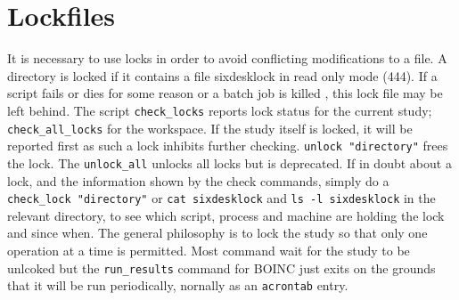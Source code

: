 \documentclass{cernatsnote}    %
\begin{document}
\section{Lockfiles}
It is necessary to use locks in order to
avoid conflicting modifications to a file. A directory is locked if
it contains a file sixdesklock in read only mode (444).
If a script fails or dies for some reason or a batch job
is killed , this lock file may be left behind. The script
{\tt check\_locks} reports lock status for the current study;
{\tt check\_all\_locks} for the workspace. If the study itself is
locked, it will be reported first as such a lock inhibits further
checking. 
{\tt unlock "directory"} frees the lock. The {\tt unlock\_all} 
unlocks all locks but is deprecated. If in doubt about a lock, 
and the information shown by the check commands, simply do a 
{\tt check\_lock "directory"} or {\tt cat sixdesklock} and
{\tt ls -l sixdesklock} in the 
relevant directory, to see which script, process and machine are 
holding the lock and since when. The general philosophy is to lock
the study so that only one operation at a time is permitted. Most
command wait for the study to be unlcoked but the {\tt run\_results}
command for BOINC just exits on the grounds that it will be run periodically,
nornally as an {\tt acrontab} entry.
 
\end{document}

